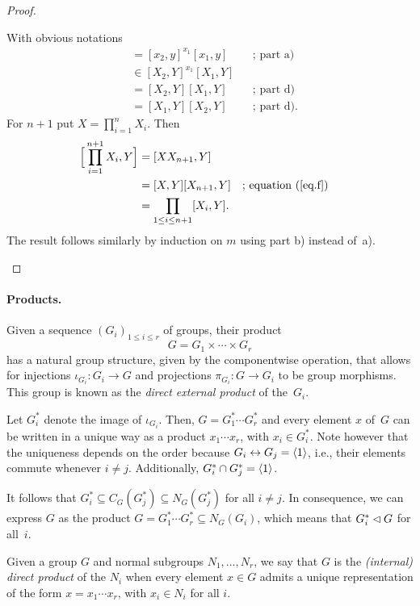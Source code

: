 \begin{proof}
\begin{enumerate}[\rm a)]
    With obvious notations
    \begin{align*}
        [x_1x_2,y] &= [x_2,y]^{x_1}[x_1,y]    &&\text{; part a)}\\
            &\in [X_2,Y]^{x_1}[X_1,Y]\\
            &= [X_2,Y][X_1,Y]    &&\text{; part d)}\\
            &= [X_1,Y][X_2,Y]    &&\text{; part d).}
    \end{align*}
    For $n+1$ put $X=\prod_{i=1}^nX_i$. Then
    \begin{align*}
        \Big[\prod_{i=1}^{n+1}X_i, Y\Big]
            &= [XX_{n+1},Y]\\
            &= [X,Y][X_{n+1},Y] &&\text{; equation }(\ref{eq.f})\\
            &= \prod_{1\le i\le n+1}[X_i,Y].
    \end{align*}
    The result follows similarly by induction on $m$ using part b) instead of~a).
\end{enumerate}
\end{proof}

\paragraph{Products.}
    Given a sequence $(G_i)_{1\le i\le r}$ of groups, their product
    $$
        G=G_1\times\cdots\times G_r
    $$
    has a natural group structure, given by the componentwise operation, that allows for injections $\iota_{G_i}\colon G_i\to G$ and projections $\pi_{G_i}\colon G\to G_i$ to be group morphisms. This group is known as the \textsl{direct external product} of the~$G_i$.

    Let\/ $G_i^*$ denote the image of\/ $\iota_{G_i}$. Then, $G=G_1^*\cdots G_r^* $ and every element $x$ of\/~$G$ can be written in a unique way as a product $x_1\cdots x_r$, with $x_i\in G_i^*$. Note however that the uniqueness depends on the order because $G_i\mathrel\leftrightarrow G_j=\langle1\rangle$, i.e., their elements commute whenever $i\ne j$. Additionally, $G_i^*\cap G_j^*=\langle1\rangle$.

    It follows that $G_i^*\subseteq C_G(G_j^*)\subseteq N_G(G_j^*)$ for all $i\ne j$. In consequence, we can express $G$ as the product $G=G_1^*\cdots G_r^*\subseteq N_G(G_i)$, which means that $G_i^*\lhd G$ for all~$i$.


\begin{defn}
    Given a group $G$ and normal subgroups $N_1,\dots,N_r$, we say that $G$ is the \textsl{(internal) direct product} of the $N_i$ when every element $x\in G$ admits a unique representation of the form $x=x_1\cdots x_r$, with $x_i\in N_i$ for all $i$.
\end{defn}

